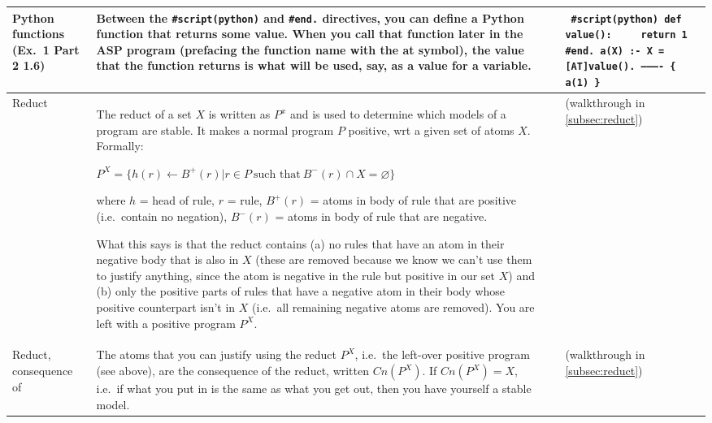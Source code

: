 \documentclass[9pt,a4paper,landscape]{article}
\begin{document}
{\begin{longtable}{Lp{14.5cm}lXX}
Python functions \newline (Ex.\ 1 Part 2 1.6)
& Between the \texttt{\#script(python)} and \texttt{\#end.} directives, you can define a Python function that returns some value.
When you call that function later in the ASP program (prefacing the function name with the at symbol), the value that the function returns is what will be used, say, as a value for a variable.

&& {\small\texttt{%
		\#script(python) \newline
		def value(): \newline
		\mbox{~~~~}return 1 \newline
		\#end. \newline \newline
		a(X) :- X = [AT]value(). \newline
		---------- \newline
		\{ a(1) \}
}} \\ \midrule

Reduct
& The reduct of a set $X$ is written as $P^x$ and is used to determine which models of a program are stable.
It makes a normal program $P$ positive, wrt a given set of atoms $X$.
Formally:
\begin{center}
	$P^X = \{h(r) \leftarrow B^+(r) | r \in P\ \text{such that}\ B^-(r) \cap X = \varnothing \}$
\end{center}
where $h$ = head of rule, $r$ = rule, $B^+(r)$ = atoms in body of rule that are positive (i.e.\ contain no negation), $B^-(r)$ = atoms in body of rule that are negative. \newline

What this says is that the reduct contains (a) no rules that have an atom in their negative body that is also in $X$ (these are removed because we know we can't use them to justify anything, since the atom is negative in the rule but positive in our set $X$) and (b) only the positive parts of rules that have a negative atom in their body whose positive counterpart isn't in $X$ (i.e.\ all remaining negative atoms are removed).
You are left with a positive program $P^X$. \newline

&& (walkthrough in \ref{subsec:reduct}) &\\ \midrule

Reduct, consequence of
& The atoms that you can justify using the reduct $P^X$, i.e.\ the left-over positive program (see above), are the consequence of the reduct, written $Cn(P^X)$.
If $Cn(P^X) = X$, i.e.\ if what you put in is the same as what you get out, then you have yourself a stable model.
&& (walkthrough in \ref{subsec:reduct}) &\\ \midrule



\end{longtable}}
\end{document}
